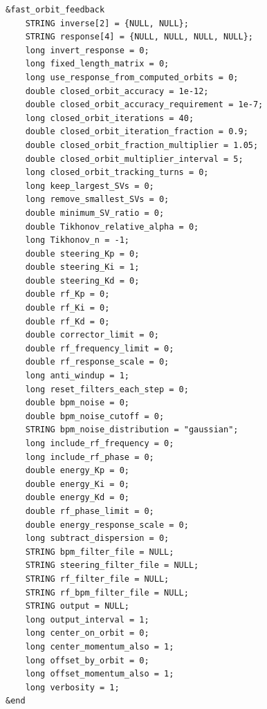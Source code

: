 \documentclass[11pt]{article}
\begin{document}
\begin{verbatim}
&fast_orbit_feedback
    STRING inverse[2] = {NULL, NULL};
    STRING response[4] = {NULL, NULL, NULL, NULL};
    long invert_response = 0;
    long fixed_length_matrix = 0;
    long use_response_from_computed_orbits = 0;
    double closed_orbit_accuracy = 1e-12;
    double closed_orbit_accuracy_requirement = 1e-7;
    long closed_orbit_iterations = 40;
    double closed_orbit_iteration_fraction = 0.9;
    double closed_orbit_fraction_multiplier = 1.05;
    double closed_orbit_multiplier_interval = 5;
    long closed_orbit_tracking_turns = 0;
    long keep_largest_SVs = 0;
    long remove_smallest_SVs = 0;
    double minimum_SV_ratio = 0;
    double Tikhonov_relative_alpha = 0;
    long Tikhonov_n = -1;
    double steering_Kp = 0;
    double steering_Ki = 1;
    double steering_Kd = 0;
    double rf_Kp = 0;
    double rf_Ki = 0;
    double rf_Kd = 0;
    double corrector_limit = 0;
    double rf_frequency_limit = 0;
    double rf_response_scale = 0;
    long anti_windup = 1;
    long reset_filters_each_step = 0;
    double bpm_noise = 0;
    double bpm_noise_cutoff = 0;
    STRING bpm_noise_distribution = "gaussian";
    long include_rf_frequency = 0;
    long include_rf_phase = 0;
    double energy_Kp = 0;
    double energy_Ki = 0;
    double energy_Kd = 0;
    double rf_phase_limit = 0;
    double energy_response_scale = 0;
    long subtract_dispersion = 0;
    STRING bpm_filter_file = NULL;
    STRING steering_filter_file = NULL;
    STRING rf_filter_file = NULL;
    STRING rf_bpm_filter_file = NULL;
    STRING output = NULL;
    long output_interval = 1;
    long center_on_orbit = 0;
    long center_momentum_also = 1;
    long offset_by_orbit = 0;
    long offset_momentum_also = 1;
    long verbosity = 1;
&end
\end{verbatim}
\end{document}

